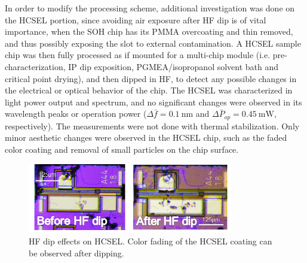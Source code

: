 
In order to modify the processing scheme, additional investigation was done on the HCSEL portion, since avoiding air exposure after HF dip is of vital importance, when the SOH chip has its PMMA overcoating and thin  removed, and thus possibly exposing the slot to external contamination. A HCSEL sample chip was then fully processed as if mounted for a multi-chip module (i.e. pre-characterization, IP dip exposition, PGMEA/isopropanol solvent bath and critical point drying), and then dipped in HF, to detect any possible changes in the electrical or optical behavior of the chip. The HCSEL was characterized in light power output and spectrum, and no significant changes were observed in its wavelength peaks or operation power ($\Delta\bar{f}=\SI{0.1}{\nano\meter}$ and $\bar{\Delta P_{op}}=\SI{0.45}{\milli\watt}$, respectively). The measurements were not done with thermal stabilization. Only minor aesthetic changes were observed in the HCSEL chip, such as the faded color coating and removal of small particles on the chip surface.


\begin{figure}[!ht]
\centering
  \includegraphics[width=0.8\textwidth]{lab/HF_dip}
  \caption{HF dip effects on HCSEL. Color fading of the HCSEL coating can be observed after dipping.}
  \label{fig:HFdips}
\end{figure}

